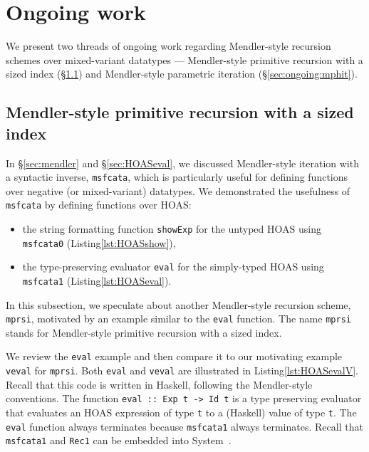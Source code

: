 \section{Ongoing work}
\label{sec:ongoing}
We present two threads of ongoing work regarding
Mendler-style recursion schemes over mixed-variant datatypes ---
Mendler-style primitive recursion with a sized index (\S\ref{sec:ongoing:mprsi})
and
Mendler-style parametric iteration (\S\ref{sec:ongoing:mphit}).\vspace*{-1.5ex}

\subsection{Mendler-style primitive recursion with a sized index}
\label{sec:ongoing:mprsi}

In \S\ref{sec:mendler} and \S\ref{sec:HOASeval}, we discussed
Mendler-style iteration with a syntactic inverse, \lstinline{msfcata},
which is particularly useful for defining functions over
negative (or mixed-variant) datatypes. We demonstrated the usefulness of
\lstinline{msfcata} by defining functions over HOAS:
\begin{itemize}
\item the string formatting function \lstinline{showExp} for
	the untyped HOAS using \lstinline{msfcata0}
	(Listing\;\ref{lst:HOASshow}),%
\item the type-preserving evaluator \lstinline{eval} for
	the simply-typed HOAS using \lstinline{msfcata1}
	(Listing\;\ref{lst:HOASeval}).\vspace*{-.7ex}
\end{itemize}

In this subsection, we speculate about another Mendler-style recursion scheme,
\lstinline{mprsi}, motivated by an example similar to the \lstinline{eval}
function. The name \lstinline{mprsi} stands for
Mendler-style primitive recursion with a sized index.\vspace*{.7ex}

\vspace*{-1ex}

We review the \lstinline{eval} example and then compare
it to our motivating example \lstinline{veval} for \lstinline{mprsi}.
Both \lstinline{eval} and \lstinline{veval} are illustrated
in Listing\;\ref{lst:HOASevalV}. Recall that this code is written in Haskell,
following the Mendler-style conventions.
The function \lstinline{eval :: Exp t -> Id t} is
a type preserving evaluator that evaluates an HOAS expression of type
\lstinline{t} to a (Haskell) value of type \lstinline{t}.
The \lstinline{eval} function always terminates because
\lstinline{msfcata1} always terminates. Recall that \lstinline{msfcata1}
and \lstinline{Rec1} can be embedded into System~\Fw.

